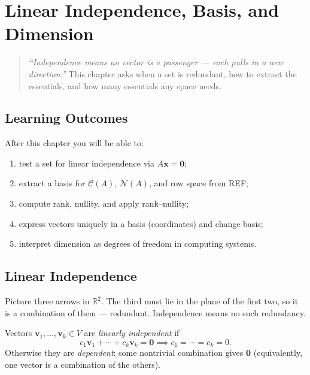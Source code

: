 \chapter{Linear Independence, Basis, and Dimension}
\label{ch:independence}

\begin{quote}
\emph{``Independence means no vector is a passenger --- each pulls in a new direction.''} This chapter asks when a set is redundant, how to extract the essentials, and how many essentials any space needs.
\end{quote}

\noindent{}
\vspace{0.4em}

\section*{Learning Outcomes}
After this chapter you will be able to:
\begin{enumerate}[label=(L\arabic*)]
    \item test a set for linear independence via $A\mathbf{x}=\mathbf{0}$;
    \item extract a basis for $\mathcal{C}(A)$, $\mathcal{N}(A)$, and row space from REF;
    \item compute rank, nullity, and apply rank--nullity;
    \item express vectors uniquely in a basis (coordinates) and change basis;
    \item interpret dimension as degrees of freedom in computing systems.
\end{enumerate}

\section{Linear Independence}
\label{sec:independence}
Picture three arrows in $\mathbb{R}^2$. The third must lie in the plane of the first two, so it is a combination of them --- redundant. Independence means no such redundancy.

\begin{definition}[Independence]
Vectors $\mathbf{v}_1,\dots,\mathbf{v}_k\in V$ are \emph{linearly independent} if
\[
  c_1\mathbf{v}_1+\cdots+c_k\mathbf{v}_k=\mathbf{0}\implies c_1=\cdots=c_k=0.
\]
Otherwise they are \emph{dependent}: some nontrivial combination gives $\mathbf{0}$ (equivalently, one vector is a combination of the others).
\end{definition}

